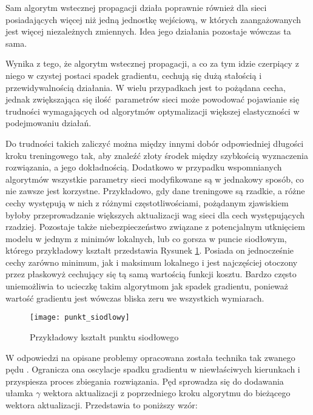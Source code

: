 \begin{enumerate}
    Sam algorytm wstecznej propagacji działa poprawnie również dla sieci posiadających
    więcej niż jedną jednostkę wejściową, w których zaangażowanych jest więcej
    niezależnych zmiennych. Idea jego działania pozostaje wówczas ta sama.

    Wynika z tego, że algorytm wstecznej propagacji, a co za tym idzie czerpiący z
    niego w czystej postaci spadek gradientu, cechują się dużą stałością i
    przewidywalnością działania. W wielu przypadkach jest to pożądana cecha, jednak
    zwiększająca się ilość parametrów sieci może powodować pojawianie się trudności
    wymagających od algorytmów optymalizacji większej elastyczności w podejmowaniu działań.

    Do trudności takich zaliczyć można między innymi dobór odpowiedniej długości
    kroku treningowego tak, aby znaleźć złoty środek między szybkością wyznaczenia
    rozwiązania, a jego dokładnością. Dodatkowo w przypadku wspomnianych algorytmów
    wszystkie parametry sieci modyfikowane są w jednakowy sposób, co nie zawsze jest
    korzystne. Przykładowo, gdy dane treningowe są rzadkie, a różne cechy występują
    w nich z różnymi częstotliwościami, pożądanym zjawiskiem byłoby przeprowadzanie większych
    aktualizacji wag sieci dla cech występujących rzadziej. Pozostaje także niebezpieczeństwo
    związane z potencjalnym utknięciem modelu w jednym z minimów lokalnych, lub co gorsza
    w puncie siodłowym, którego przykładowy kształt przedstawia Rysunek \ref{fig:punkt_siodlowy}.
    Posiada on jednocześnie cechy zarówno minimum, jak i maksimum lokalnego i jest najczęściej
    otoczony przez płaskowyż cechujący się tą samą wartością funkcji kosztu. Bardzo często
    uniemożliwia to ucieczkę takim algorytmom jak spadek gradientu, ponieważ wartość
    gradientu jest wówczas bliska zeru we wszystkich wymiarach.

    \begin{figure}[H]
      \centering
      \texttt{[image: punkt\_siodlowy]}
      \caption[Przykładowy kształt punktu siodłowego - źródło: \url{https://towardsdatascience.com}]{Przykładowy kształt punktu siodłowego}
      \label{fig:punkt_siodlowy}
    \end{figure}

    W odpowiedzi na opisane problemy opracowana została technika tak zwanego
    pędu \cite{Momentum}. Ogranicza ona oscylacje spadku gradientu w niewłaściwych kierunkach i
    przyspiesza proces zbiegania rozwiązania. Pęd sprowadza się do dodawania ułamka
    $\gamma$ wektora aktualizacji z poprzedniego kroku algorytmu do bieżącego wektora
    aktualizacji. Przedstawia to poniższy wzór:


\end{enumerate}
